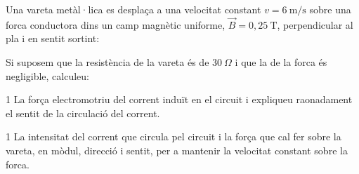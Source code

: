 Una vareta metàl·lica es desplaça a una velocitat constant $v = 6\ \mathrm{m/s}$ sobre una forca conductora dins un camp magnètic uniforme, $\vec{B} = 0,25\ \mathrm{T}$, perpendicular al pla i en sentit sortint:


Si suposem que la resistència de la vareta és de $30\ \Omega$ i que la de la forca és negligible, calculeu:

\begin{apartat}{1}
La força electromotriu del corrent induït en el circuit i expliqueu raonadament el sentit de la circulació del corrent.
\end{apartat}

\begin{apartat}{1}
La intensitat del corrent que circula pel circuit i la força que cal fer sobre la vareta, en mòdul, direcció i sentit, per a mantenir la velocitat constant sobre la forca.
\end{apartat}

